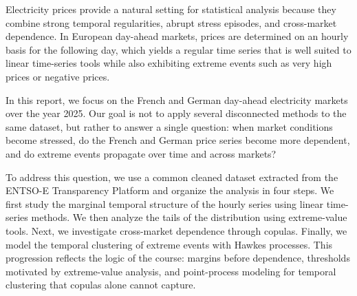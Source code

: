 Electricity prices provide a natural setting for statistical analysis because they combine strong temporal regularities, abrupt stress episodes, and cross-market dependence. In European day-ahead markets, prices are determined on an hourly basis for the following day, which yields a regular time series that is well suited to linear time-series tools while also exhibiting extreme events such as very high prices or negative prices.

In this report, we focus on the French and German day-ahead electricity markets over the year 2025. Our goal is not to apply several disconnected methods to the same dataset, but rather to answer a single question: when market conditions become stressed, do the French and German price series become more dependent, and do extreme events propagate over time and across markets?

To address this question, we use a common cleaned dataset extracted from the ENTSO-E Transparency Platform and organize the analysis in four steps. We first study the marginal temporal structure of the hourly series using linear time-series methods. We then analyze the tails of the distribution using extreme-value tools. Next, we investigate cross-market dependence through copulas. Finally, we model the temporal clustering of extreme events with Hawkes processes. This progression reflects the logic of the course: margins before dependence, thresholds motivated by extreme-value analysis, and point-process modeling for temporal clustering that copulas alone cannot capture.
